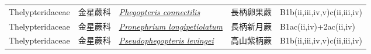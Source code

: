 {\begin{longtable}{L{2.5cm}L{2cm}L{5cm}L{2.5cm}L{3cm}}
    Thelypteridaceae & 金星蕨科 & \href{http://www.theplantlist.org/tpl1.1/search?q=Phegopteris+connectilis}{\textit{Phegopteris connectilis} } & 長柄卵果蕨 & B1b(ii,iii,iv,v)c(ii,iii,iv)    \\
    Thelypteridaceae & 金星蕨科 & \href{http://www.theplantlist.org/tpl1.1/search?q=Pronephrium+longipetiolatum}{\textit{Pronephrium longipetiolatum} } & 長柄新月蕨 & B1ac(ii,iv)+2ac(ii,iv)    \\
    Thelypteridaceae & 金星蕨科 & \href{http://www.theplantlist.org/tpl1.1/search?q=Pseudophegopteris+levingei}{\textit{Pseudophegopteris levingei} } & 高山紫柄蕨 & B1b(ii,iii,iv,v)c(ii,iii,iv)    \\
    \bottomrule
        \end{longtable}
        }
    